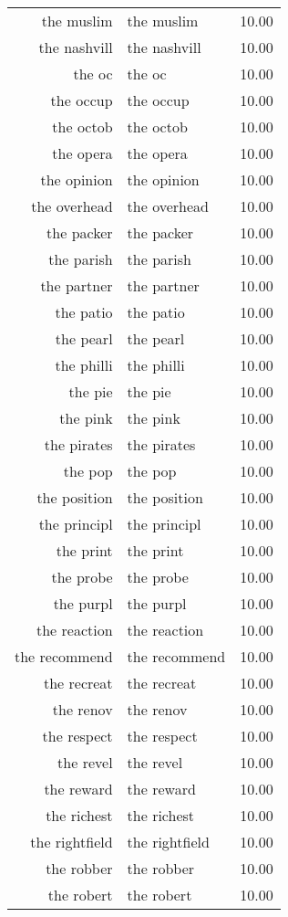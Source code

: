 \begin{table}[ht]
\begin{tabular}{rlr}
  the muslim & the muslim & 10.00 \\ 
  the nashvill & the nashvill & 10.00 \\ 
  the oc & the oc & 10.00 \\ 
  the occup & the occup & 10.00 \\ 
  the octob & the octob & 10.00 \\ 
  the opera & the opera & 10.00 \\ 
  the opinion & the opinion & 10.00 \\ 
  the overhead & the overhead & 10.00 \\ 
  the packer & the packer & 10.00 \\ 
  the parish & the parish & 10.00 \\ 
  the partner & the partner & 10.00 \\ 
  the patio & the patio & 10.00 \\ 
  the pearl & the pearl & 10.00 \\ 
  the philli & the philli & 10.00 \\ 
  the pie & the pie & 10.00 \\ 
  the pink & the pink & 10.00 \\ 
  the pirates & the pirates & 10.00 \\ 
  the pop & the pop & 10.00 \\ 
  the position & the position & 10.00 \\ 
  the principl & the principl & 10.00 \\ 
  the print & the print & 10.00 \\ 
  the probe & the probe & 10.00 \\ 
  the purpl & the purpl & 10.00 \\ 
  the reaction & the reaction & 10.00 \\ 
  the recommend & the recommend & 10.00 \\ 
  the recreat & the recreat & 10.00 \\ 
  the renov & the renov & 10.00 \\ 
  the respect & the respect & 10.00 \\ 
  the revel & the revel & 10.00 \\ 
  the reward & the reward & 10.00 \\ 
  the richest & the richest & 10.00 \\ 
  the rightfield & the rightfield & 10.00 \\ 
  the robber & the robber & 10.00 \\ 
  the robert & the robert & 10.00 \\ 

\end{tabular}
\end{table}
